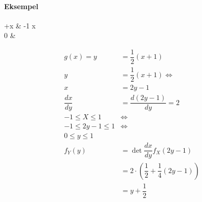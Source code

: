 \documentclass[Main]{subfiles}
\begin{document}
\paragraph{Eksempel}
\begin{FunArg}
+\cdot x & -1 \leq x  \\
0 & 
\end{FunArg}
\begin{align*}
g(x) = y &= \dfrac{1}{2}(x+1)\\
y &= \dfrac{1}{2}(x+1) \Leftrightarrow\\
x &= 2y-1\\
\dfrac{dx}{dy} &= \dfrac{d(2y-1)}{dy} = 2\\
-1 \leq X \leq 1 &\Leftrightarrow\\
-1 \leq 2y-1 \leq 1 &\Leftrightarrow\\
0 \leq y \leq 1 \\
f_Y(y) &= \det \dfrac{dx}{dy} f_X(2y-1)\\
	&= 2\cdot (\dfrac{1}{2}+\dfrac{1}{4}(2y-1))\\
	&= y+\dfrac{1}{2}
\end{align*}
\end{document}
